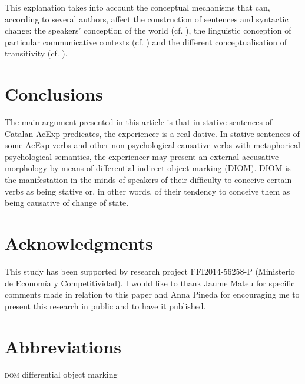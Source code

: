 \documentclass[output=paper,colorlinks,citecolor=brown,nonflat,modfonts]{langsci/langscibook}
\begin{document}
This explanation takes into account the conceptual mechanisms that can, according to several authors, affect the construction of sentences and syntactic change: the speakers’ conception of the world (cf. \citealt{Ramos2002}), the linguistic conception of particular communicative contexts (cf. \citealt{Rossello2008}) and the different conceptualisation of transitivity (cf. \citealt{Ynglès2011, Pineda2012}).

\section{Conclusions}\label{sec:royo:6}

The main argument presented in this article is that in stative sentences of Catalan AcExp predicates, the experiencer is a real dative. In stative sentences of some AcExp verbs and other non-psychological causative verbs with metaphorical psychological semantics, the experiencer may present an external accusative morphology by means of differential indirect object marking (DIOM). DIOM is the manifestation in the minds of speakers of their difficulty to conceive certain verbs as being stative or, in other words, of their tendency to conceive them as being causative of change of state.

\section*{Acknowledgments} This study has been supported by research project FFI2014-56258-P ({Ministerio de Economía y Competitividad}). I would like to thank Jaume Mateu for specific comments made in relation to this paper and Anna Pineda for encouraging me to present this research in public and to have it published.

\section*{Abbreviations} 
\textsc{dom} differential object marking

\sloppy\printbibliography[heading=subbibliography,notkeyword=this]
\end{document}
